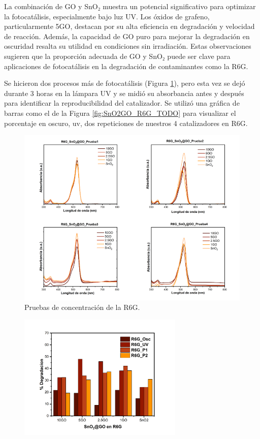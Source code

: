 \documentclass[12pt]{article}
\begin{document}
La combinación de GO y SnO₂ muestra un potencial significativo para optimizar la fotocatálisis, especialmente bajo luz UV. Los óxidos de grafeno, particularmente 5GO, destacan por su alta eficiencia en degradación y velocidad de reacción. Además, la capacidad de GO puro para mejorar la degradación en oscuridad resalta su utilidad en condiciones sin irradiación. Estas observaciones sugieren que la proporción adecuada de GO y SnO₂ puede ser clave para aplicaciones de fotocatálisis en la degradación de contaminantes como la R6G.\vspace{1em} %

Se hicieron dos procesos más de fotocatálisis (Figura \ref{fig:PruebasR6G_SNO2GO}), pero esta vez se dejó durante 3 horas en la lámpara UV y se midió su absorbancia antes y después para identificar la reproducibilidad del catalizador. Se utilizó una gráfica de barras como el de la Figura \ref{fig:SnO2GO_R6G_TODO} para visualizar el porcentaje en oscuro, uv, dos repeticiones de nuestros 4 catalizadores en R6G.

 \begin{figure}[htbp]
    \centering
    \includegraphics[width=0.7\linewidth]{Imagenes/RepeticionesR6G.png}
    \caption{Pruebas de concentración de la R6G.}
    \label{fig:PruebasR6G_SNO2GO}
    \end{figure}

\begin{figure}[H]
    	   \begin{center}
     	  	\includegraphics[width = 0.7\textwidth]{Imagenes/R6G_PruebasSnO2.png}
    	   \end{center} 
        \end{figure}
        
\end{document}
